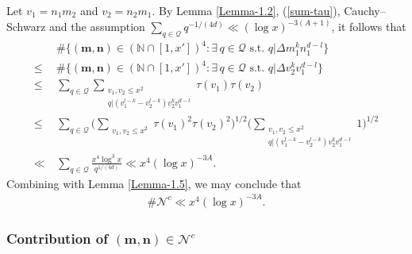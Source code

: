 \documentclass[reqno, 11pt]{amsart}
\renewcommand{\leq}{\leqslant}
\theoremstyle{definition}
\theoremstyle{definition}
\renewcommand{\leq}{\leqslant}
\newcommand{\mm}{\mathbf{m}}
\newcommand{\nn}{\mathbf{n}}
\newcommand{\NN}{\mathbb{N}}
\numberwithin{equation}{section}
\begin{document}
Let $v_1 = n_1m_2$ and $v_2 = n_2m_1$. By Lemma \ref{Lemma-1.2}, (\ref{sum-tau}), Cauchy--Schwarz and the assumption $\sum_{q \in \mathcal{Q}} q^{-1/(4d)} \ll (\log x)^{-3(A+1)}$, it follows that
\begin{align*}
   & \ \# \{ (\mm,\nn) \in (\NN \cap [1, x'])^4: \exists \, q \in \mathcal{Q} \text{ s.t. } q | \Delta m_1^k n_1^{d-l} \} \\
   \leq & \ \# \{ (\mm,\nn) \in (\NN \cap [1, x'])^4: \exists \, q \in \mathcal{Q} \text{ s.t. } q | \Delta v_2^k v_1^{d-l} \} \\
   \leq & \ \sum_{q \in \mathcal{Q}} \sum_{\substack{v_1, v_2 \leq x^2 \\ q | (v_1^{l-k} - v_2^{l-k}) v_2^k v_1^{d-l} }}  \tau(v_1) \tau(v_2)  \\
   \leq & \ \sum_{q \in \mathcal{Q}} \Big( \sum_{\substack{v_1, v_2 \leq x^2}} \tau(v_1)^2 \tau(v_2)^2 \Big)^{1/2}
   \Big(\sum_{\substack{v_1, v_2 \leq x^2 \\ q | (v_1^{l-k} - v_2^{l-k})v_2^k v_1^{d-l}}} 1 \Big)^{1/2} \\
   \ll & \ \sum_{q \in \mathcal{Q}} \frac{x^4 \log^3 x}{q^{1/{(4d)}}} \ll  x^4(\log x)^{-3A}.
\end{align*}
Combining with Lemma \ref{Lemma-1.5}, we may conclude that
\begin{align}\label{est-N^c}
    \# \mathcal{N}^c \ll x^4 (\log x)^{-3A}.
\end{align}



\subsubsection*{Contribution of $(\mm, \nn) \in \mathcal{N}^c$}
\end{document}
